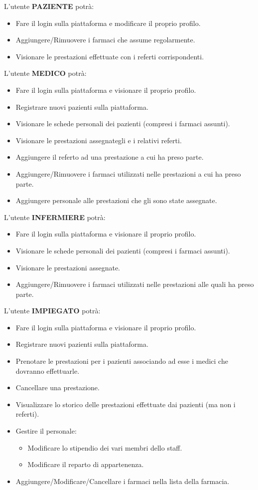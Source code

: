 \documentclass[paper=a4, fontsize=11pt,x11names]{report}
\begin{document}
L'utente \textbf{PAZIENTE} potrà:
\begin{itemize}
\item Fare il login sulla piattaforma e modificare il proprio profilo.
\item Aggiungere/Rimuovere i farmaci che assume regolarmente.
\item Visionare le prestazioni effettuate con i referti corrispondenti.
\end{itemize}

L'utente \textbf{MEDICO} potrà:
\begin{itemize}
\item Fare il login sulla piattaforma e visionare il proprio profilo.
\item Registrare nuovi pazienti sulla piattaforma.
\item Visionare le schede personali dei pazienti (compresi i farmaci assunti).
\item Visionare le prestazioni assegnategli e i relativi referti.
\item Aggiungere il referto ad una prestazione a cui ha preso parte.
\item Aggiungere/Rimuovere i farmaci utilizzati nelle prestazioni a cui ha preso parte.
\item Aggiungere personale alle prestazioni che gli sono state assegnate.
\end{itemize}

L'utente \textbf{INFERMIERE} potrà:
\begin{itemize}
\item Fare il login sulla piattaforma e visionare il proprio profilo.
\item Visionare le schede personali dei pazienti (compresi i farmaci assunti).
\item Visionare le prestazioni assegnate.
\item Aggiungere/Rimuovere i farmaci utilizzati nelle prestazioni alle quali ha preso parte.
\end{itemize}

L'utente \textbf{IMPIEGATO} potrà:
\begin{itemize}
\item Fare il login sulla piattaforma e visionare il proprio profilo.
\item Registrare nuovi pazienti sulla piattaforma.
\item Prenotare le prestazioni per i pazienti associando ad esse i medici che dovranno effettuarle.
\item Cancellare una prestazione.
\item Visualizzare lo storico delle prestazioni effettuate dai pazienti (ma non i referti). 
\item Gestire il personale:
	\begin{itemize}
		\item Modificare lo stipendio dei vari membri dello staff.
		\item Modificare il reparto di appartenenza.
	\end{itemize}
\item Aggiungere/Modificare/Cancellare i farmaci nella lista della farmacia.
\end{itemize}
\end{document}
